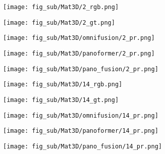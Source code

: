 \begin{figure*}[t]
	\centering
	\captionsetup[subfigure]{labelformat=empty}
	
	\begin{subfigure}{0.18\linewidth}
		\texttt{[image: fig\_sub/Mat3D/2\_rgb.png]}
	\end{subfigure}
	\begin{subfigure}{0.18\linewidth}
		\texttt{[image: fig\_sub/Mat3D/2\_gt.png]}
	\end{subfigure}
	\begin{subfigure}{0.18\linewidth}
		\texttt{[image: fig\_sub/Mat3D/omnifusion/2\_pr.png]}
	\end{subfigure}
	\begin{subfigure}{0.18\linewidth}
		\texttt{[image: fig\_sub/Mat3D/panoformer/2\_pr.png]}
	\end{subfigure}
	\begin{subfigure}{0.18\linewidth}
		\texttt{[image: fig\_sub/Mat3D/pano\_fusion/2\_pr.png]}
	\end{subfigure}
	
	\vspace{1pt}
	
	
	\begin{subfigure}{0.18\linewidth}
		\texttt{[image: fig\_sub/Mat3D/14\_rgb.png]}
	\end{subfigure}
	\begin{subfigure}{0.18\linewidth}
		\texttt{[image: fig\_sub/Mat3D/14\_gt.png]}
	\end{subfigure}
	\begin{subfigure}{0.18\linewidth}
		\texttt{[image: fig\_sub/Mat3D/omnifusion/14\_pr.png]}
	\end{subfigure}
	\begin{subfigure}{0.18\linewidth}
		\texttt{[image: fig\_sub/Mat3D/panoformer/14\_pr.png]}
	\end{subfigure}
	\begin{subfigure}{0.18\linewidth}
		\texttt{[image: fig\_sub/Mat3D/pano\_fusion/14\_pr.png]}
	\end{subfigure}
	
	\vspace{1pt}
	

\end{figure*}
